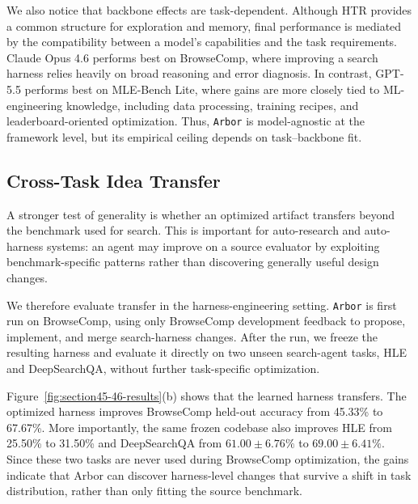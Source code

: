 \documentclass[]{selfevolagent}
\theoremstyle{plain}
\theoremstyle{definition}
\theoremstyle{remark}
\newcommand{\arbor}{\texttt{Arbor}}
\newcommand{\htr}{\textsc{HTR}}
\begin{document}
We also notice that backbone effects are task-dependent. Although
\htr{} provides a common structure for exploration and memory, final
performance is mediated by the compatibility between a model's capabilities and
the task requirements. Claude Opus 4.6 performs best on BrowseComp, where
improving a search harness relies heavily on broad reasoning and error
diagnosis. In contrast, GPT-5.5 performs best on MLE-Bench Lite, where gains are
more closely tied to ML-engineering knowledge, including data processing,
training recipes, and leaderboard-oriented optimization. Thus, \arbor{} is
model-agnostic at the framework level, but its empirical ceiling depends on
task--backbone fit.


\subsection{Cross-Task Idea Transfer}
\label{sec:exp-transfer}

A stronger test of generality is whether an optimized artifact transfers beyond the benchmark used for search. This is important for auto-research and auto-harness systems: an agent may improve on a source evaluator by exploiting benchmark-specific patterns rather than discovering generally useful design changes.

We therefore evaluate transfer in the harness-engineering setting. \arbor{} is first run on BrowseComp, using only BrowseComp development feedback to propose, implement, and merge search-harness changes. After the run, we freeze the resulting harness and evaluate it directly on two unseen search-agent tasks, HLE and DeepSearchQA, without further task-specific optimization.

Figure~\ref{fig:section45-46-results}(b) shows that the learned harness transfers. The optimized harness improves BrowseComp held-out accuracy from 45.33\% to 67.67\%. More importantly, the same frozen codebase also improves HLE from 25.50\% to 31.50\% and DeepSearchQA from $61.00\pm6.76\%$ to $69.00\pm6.41\%$. Since these two tasks are never used during BrowseComp optimization, the gains indicate that Arbor can discover harness-level changes that survive a shift in task distribution, rather than only fitting the source benchmark.
\end{document}
